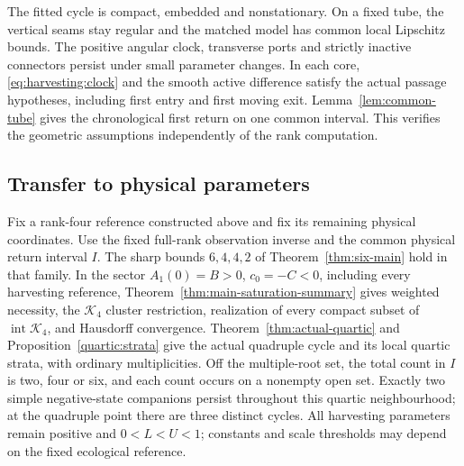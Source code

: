 The fitted cycle is compact, embedded and nonstationary. On a fixed tube,
the vertical seams stay regular and the matched model has common local
Lipschitz bounds. The positive angular clock, transverse ports and strictly
inactive connectors persist under small parameter changes. In each core,
\eqref{eq:harvesting:clock} and the smooth active difference satisfy the
actual passage hypotheses, including first entry and first moving exit.
Lemma~\ref{lem:common-tube} gives the chronological first return on one
common interval. This verifies the geometric assumptions independently
of the rank computation.

\subsection{Transfer to physical parameters}

\begin{corollary}
\label{cor:realization-transfer}
Fix a rank-four reference constructed above and fix its remaining physical
coordinates. Use the fixed full-rank observation inverse and the common
physical return interval \(I\). The sharp bounds \(6,4,4,2\) of
Theorem~\ref{thm:six-main} hold in that family. In the sector
$A_1(0)=B>0$, $c_0=-C<0$, including every harvesting reference,
Theorem~\ref{thm:main-saturation-summary} gives weighted necessity,
the \(\mathcal K_4\) cluster restriction, realization of every compact
subset of \(\operatorname{int}\mathcal K_4\), and Hausdorff convergence.
Theorem~\ref{thm:actual-quartic} and Proposition~\ref{quartic:strata}
give the actual quadruple cycle and its local quartic strata, with ordinary
multiplicities. Off the multiple-root set, the total count in \(I\)
is two, four or six, and each count occurs on a nonempty open set.
Exactly two simple negative-state companions persist throughout this
quartic neighbourhood; at the quadruple point there are three distinct cycles.
All harvesting parameters remain positive and $0<L<U<1$; constants and
scale thresholds may depend on the fixed ecological reference.
\end{corollary}

